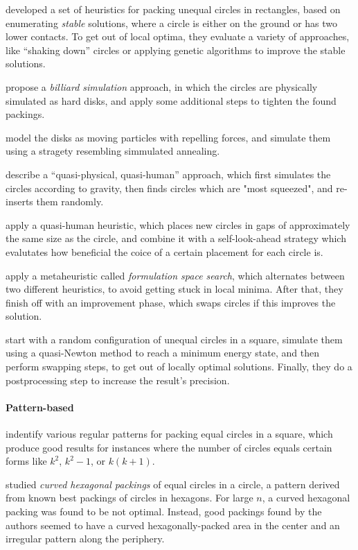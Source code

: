 \documentclass[a4paper,style=print,oneside,bibliography=totoc,nexus,lnum,extramargin]{tubsbook}
\begin{document}
\textcite{GGL1995packing} developed a set of heuristics for packing unequal circles in rectangles, based on enumerating \emph{stable} solutions, where a circle is either on the ground or has two lower contacts. To get out of local optima, they evaluate a variety of approaches, like “shaking down” circles or applying genetic algorithms to improve the stable solutions.

\textcite{GLNO1998dense} propose a \emph{billiard simulation} approach, in which the circles are physically simulated as hard disks, and apply some additional steps to tighten the found packings.

\textcite{BDGL2000improving} model the disks as moving particles with repelling forces, and simulate them using a stragety resembling simmulated annealing.

\textcite{WHZX2002improved} describe a “quasi-physical, quasi-human” approach, which first simulates the circles according to gravity, then finds circles which are "most squeezed", and re-inserts them randomly.

\textcite{HLLX2006new} apply a quasi-human heuristic, which places new circles in gaps of approximately the same size as the circle, and combine it with a self-look-ahead strategy which evalutates how beneficial the coice of a certain placement for each circle is.

\textcite{LB2013packing} apply a metaheuristic called \emph{formulation space search}, which alternates between two different heuristics, to avoid getting stuck in local minima. After that, they finish off with an improvement phase, which swaps circles if this improves the solution.

\textcite{HHY2015action} start with a random configuration of unequal circles in a square, simulate them using a quasi-Newton method to reach a minimum energy state, and then perform swapping steps, to get out of locally optimal solutions. Finally, they do a postprocessing step to increase the result's precision.

\paragraph{Pattern-based}

\textcite{GL1996repeated} indentify various regular patterns for packing equal circles in a square, which produce good results for instances where the number of circles equals certain forms like $k^2$, $k^2-1$, or $k(k+1)$.

\textcite{lubachevsky1997curved} studied \emph{curved hexagonal packings} of equal circles in a circle, a pattern derived from known best packings of circles in hexagons. For large $n$, a curved hexagonal packing was found to be not optimal. Instead, good packings found by the authors seemed to have a curved hexagonally-packed area in the center and an irregular pattern along the periphery.
\end{document}

